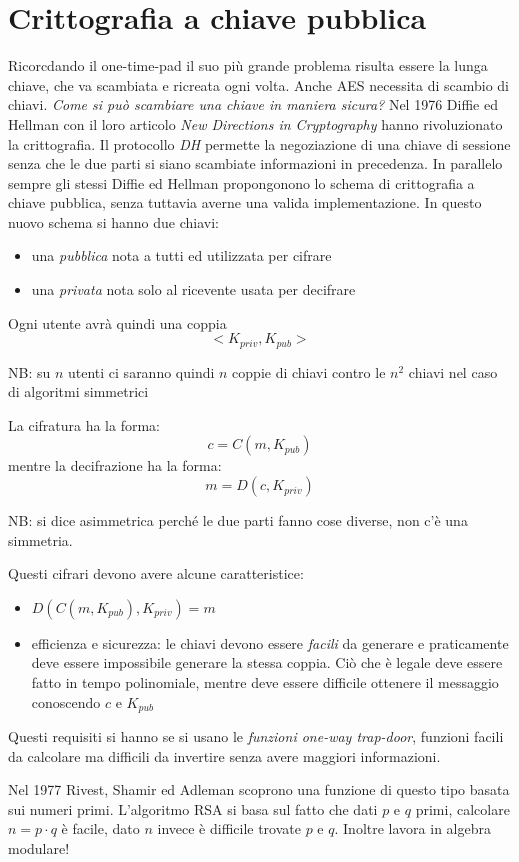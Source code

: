 \section{Crittografia a chiave pubblica}
Ricorcdando il one-time-pad il suo più grande problema risulta essere la lunga chiave, che va scambiata e ricreata ogni volta.
Anche AES necessita di scambio di chiavi.
\emph{Come si può scambiare una chiave in maniera sicura?}
Nel 1976 Diffie ed Hellman con il loro articolo \emph{New Directions in Cryptography} hanno rivoluzionato la crittografia.
Il protocollo \emph{DH} permette la negoziazione di una chiave di sessione senza che le due parti si siano scambiate informazioni in precedenza.
In parallelo sempre gli stessi Diffie ed Hellman propongonono lo schema di crittografia a chiave pubblica, senza tuttavia averne una valida implementazione.
In questo nuovo schema si hanno due chiavi:
\begin{itemize}
    \item una \emph{pubblica} nota a tutti ed utilizzata per cifrare
    \item una \emph{privata} nota solo al ricevente usata per decifrare
\end{itemize}
Ogni utente avrà quindi una coppia
$$ <K_{priv}, K_{pub}> $$

NB: su $n$ utenti ci saranno quindi $n$ coppie di chiavi contro le $n^2$ chiavi nel caso di algoritmi simmetrici

La cifratura ha la forma:
$$ c = C(m, K_{pub}) $$
mentre la decifrazione ha la forma:
$$ m = D(c, K_{priv})$$

NB: si dice asimmetrica perché le due parti fanno cose diverse, non c'è una simmetria.

Questi cifrari devono avere alcune caratteristice:
\begin{itemize}
    \item $D(C(m, K_{pub}), K_{priv}) = m$
    \item efficienza e sicurezza: le chiavi devono essere \emph{facili} da generare e praticamente deve essere impossibile generare la stessa coppia.
    Ciò che è legale deve essere fatto in tempo polinomiale, mentre deve essere difficile ottenere il messaggio conoscendo $c$ e $K_{pub}$
\end{itemize}

Questi requisiti si hanno se si usano le \emph{funzioni one-way trap-door}, funzioni facili da calcolare ma difficili da invertire senza avere maggiori informazioni.

Nel 1977 Rivest, Shamir ed Adleman scoprono una funzione di questo tipo basata sui numeri primi.
L'algoritmo RSA si basa sul fatto che dati $p$ e $q$ primi, calcolare $n = p \cdot q$ è facile, dato $n$ invece è difficile trovate $p$ e $q$.
Inoltre lavora in algebra modulare!

